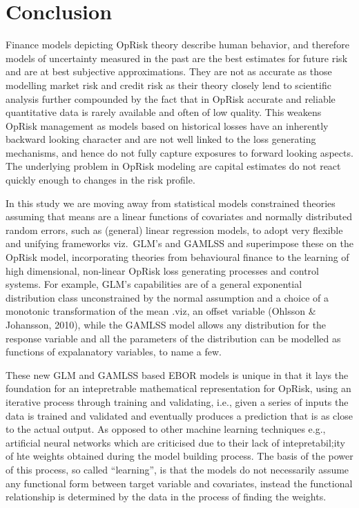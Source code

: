 \documentclass{DissertateUSU}
\begin{document}
\section{Conclusion}
\label{sec:Conclusion}

Finance models depicting OpRisk theory describe human behavior, and
therefore models of uncertainty measured in the past are the best
estimates for future risk and are at best subjective approximations.
They are not as accurate as those modelling market risk and credit risk
as their theory closely lend to scientific analysis further compounded
by the fact that in OpRisk accurate and reliable quantitative data is
rarely available and often of low quality. This weakens OpRisk
management as models based on historical losses have an inherently
backward looking character and are not well linked to the loss
generating mechanisms, and hence do not fully capture exposures to
forward looking aspects. The underlying problem in OpRisk modeling are
capital estimates do not react quickly enough to changes in the risk
profile. \medskip

In this study we are moving away from statistical models constrained
theories assuming that means are a linear functions of covariates and
normally distributed random errors, such as (general) linear regression
models, to adopt very flexible and unifying frameworks viz.~GLM's and
GAMLSS and superimpose these on the OpRisk model, incorporating theories
from behavioural finance to the learning of high dimensional, non-linear
OpRisk loss generating processes and control systems. For example, GLM's
capabilities are of a general exponential distribution class
unconstrained by the normal assumption and a choice of a monotonic
transformation of the mean .viz, an offset variable (Ohlsson \&
Johansson, 2010), while the GAMLSS model allows any distribution for the
response variable and all the parameters of the distribution can be
modelled as functions of expalanatory variables, to name a few.\medskip

These new GLM and GAMLSS based EBOR models is unique in that it lays the
foundation for an intepretrable mathematical representation for OpRisk,
using an iterative process through training and validating, i.e., given
a series of inputs the data is trained and validated and eventually
produces a prediction that is as close to the actual output. As opposed
to other machine learning techniques e.g., artificial neural networks
which are criticised due to their lack of intepretabil;ity of hte
weights obtained during the model building process. The basis of the
power of this process, so called ``learning'', is that the models do not
necessarily assume any functional form between target variable and
covariates, instead the functional relationship is determined by the
data in the process of finding the weights.
\end{document}
